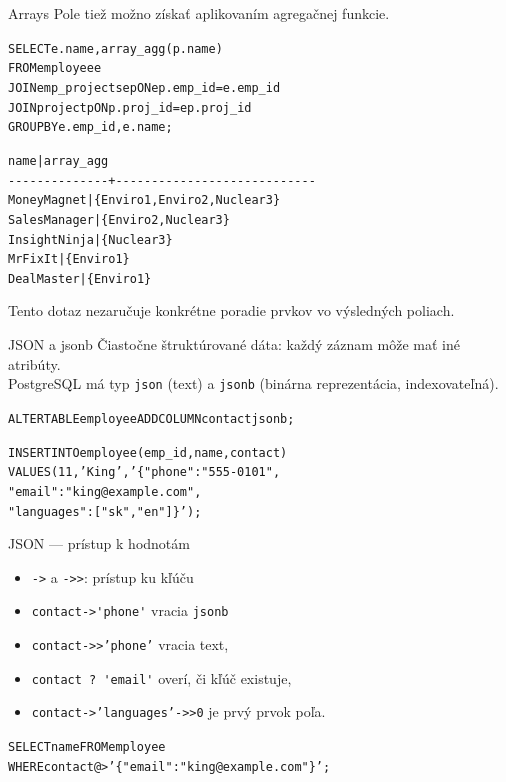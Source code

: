 \documentclass[12pt]{beamer}
\begin{document}
\begin{frame}[fragile]{Arrays}
\small
Pole tiež možno získať aplikovaním agregačnej funkcie.
\begin{alltt}
SELECT e.name, \alert{array_agg}(p.name)
FROM employee e
    JOIN emp_projects ep ON ep.emp_id = e.emp_id
    JOIN project p ON p.proj_id = ep.proj_id
GROUP BY e.emp_id, e.name;
\end{alltt}
{\color{Cerulean}
\begin{alltt}
     name     |         array_agg
-{}-{}-{}-{}-{}-{}-{}-{}-{}-{}-{}-{}-{}-{}+-{}-{}-{}-{}-{}-{}-{}-{}-{}-{}-{}-{}-{}-{}-{}-{}-{}-{}-{}-{}-{}-{}-{}-{}-{}-{}-{}-{}
 MoneyMagnet  | \{Enviro1,Enviro2,Nuclear3\}
 SalesManager | \{Enviro2,Nuclear3\}
 InsightNinja | \{Nuclear3\}
 MrFixIt      | \{Enviro1\}
 DealMaster   | \{Enviro1\}
\end{alltt}
}
Tento dotaz nezaručuje konkrétne poradie prvkov vo výsledných poliach.
\end{frame}


\begin{frame}[fragile]{JSON a jsonb}
Čiastočne štruktúrované dáta: každý záznam môže mať iné atribúty.\\
PostgreSQL má typ \alert{\texttt{json}} (text) a \alert{\texttt{jsonb}} (binárna reprezentácia, indexovateľná).
\bigskip

\begin{alltt}
ALTER TABLE employee ADD COLUMN contact jsonb;

INSERT INTO employee (emp_id, name, contact)
VALUES (11, 'King', '\{"phone": "555-0101",
  "email": "king@example.com",
  "languages": ["sk", "en"]\}');
\end{alltt}
\end{frame}

\begin{frame}[fragile]{JSON --- prístup k hodnotám}
\begin{itemize}
\item \alert{\texttt{->}} a \alert{\texttt{-{}>{}>}}: prístup ku kľúču
\item \verb|contact->'phone'| vracia \verb|jsonb|
\item \texttt{contact-{}>{}>'phone'} vracia text,
\item \verb|contact ? 'email'| overí, či kľúč existuje,
\item \texttt{contact->'languages'-{}>{}>0} je prvý prvok poľa.
\end{itemize}
\begin{alltt}
SELECT name FROM employee
WHERE contact \alert{@>} '\{"email": "king@example.com"\}';
\end{alltt}
\end{frame}
\end{document}
